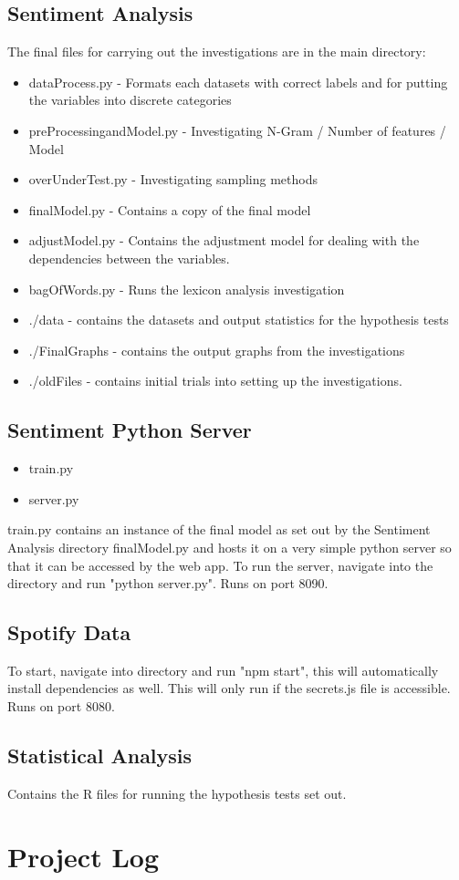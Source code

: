 \begin{appendices}
\subsection{Sentiment Analysis}

The final files for carrying out the investigations are in the main directory:

\begin{itemize}
    \item dataProcess.py - Formats each datasets with correct labels and for putting the variables into discrete categories
    \item preProcessingandModel.py - Investigating N-Gram / Number of features / Model
    \item overUnderTest.py - Investigating sampling methods
    \item finalModel.py - Contains a copy of the final model
    \item adjustModel.py  - Contains the adjustment model for dealing with the dependencies between the variables.
    \item bagOfWords.py - Runs the lexicon analysis investigation
    \item ./data -  contains the datasets and output statistics for the hypothesis tests
    \item ./FinalGraphs -  contains the output graphs from the investigations
    \item ./oldFiles - contains initial trials into setting up the investigations.
\end{itemize}


\subsection{Sentiment Python Server}

\begin{itemize}
    \item train.py
    \item server.py
\end{itemize}
train.py contains an instance of the final model as set out by the Sentiment Analysis directory finalModel.py and  hosts it on a very simple python server so that it can be accessed by the web app. 
To run the server, navigate into the directory and run "python server.py". Runs on port 8090.

\subsection{Spotify Data}
To start, navigate into directory and run "npm start", this will automatically install dependencies as well.  This will only run if the secrets.js file is accessible. Runs on port 8080.

\subsection{Statistical Analysis}
Contains the R files for running the hypothesis tests set out.

\section{Project Log}

\end{appendices}
